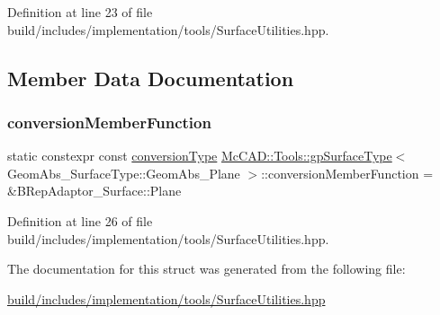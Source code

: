 Definition at line 23 of file build/includes/implementation/tools/\+Surface\+Utilities.\+hpp.



\subsection{Member Data Documentation}
\mbox{\label{structMcCAD_1_1Tools_1_1gpSurfaceType_3_01GeomAbs__SurfaceType_1_1GeomAbs__Plane_01_4_aa3676afddbb387eb819d0ce84dd83210}} 
\subsubsection{\texorpdfstring{conversion\+Member\+Function}{conversionMemberFunction}}
{\footnotesize\ttfamily static constexpr const \hyperlink{structMcCAD_1_1Tools_1_1gpSurfaceType_3_01GeomAbs__SurfaceType_1_1GeomAbs__Plane_01_4_af051c9209de7043f45d15c7394d66710}{conversion\+Type} \hyperlink{structMcCAD_1_1Tools_1_1gpSurfaceType}{Mc\+C\+A\+D\+::\+Tools\+::gp\+Surface\+Type}$<$ Geom\+Abs\+\_\+\+Surface\+Type\+::\+Geom\+Abs\+\_\+\+Plane $>$\+::conversion\+Member\+Function = \&B\+Rep\+Adaptor\+\_\+\+Surface\+::\+Plane\hspace{0.3cm}{\ttfamily [static]}}



Definition at line 26 of file build/includes/implementation/tools/\+Surface\+Utilities.\+hpp.



The documentation for this struct was generated from the following file\+:\begin{DoxyCompactItemize}
\item 
\hyperlink{build_2includes_2implementation_2tools_2SurfaceUtilities_8hpp}{build/includes/implementation/tools/\+Surface\+Utilities.\+hpp}\end{DoxyCompactItemize}
